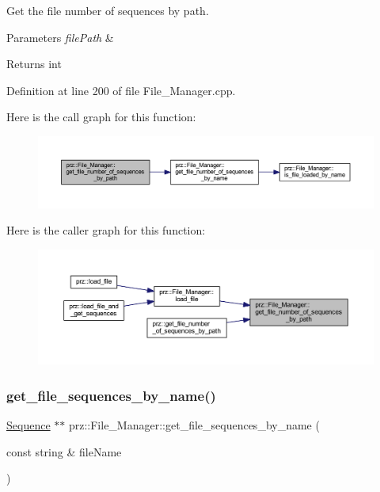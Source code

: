 Get the file number of sequences by path. 


\begin{DoxyParams}{Parameters}
{\em file\+Path} & \\
\hline
\end{DoxyParams}
\begin{DoxyReturn}{Returns}
int 
\end{DoxyReturn}


Definition at line 200 of file File\+\_\+\+Manager.\+cpp.

Here is the call graph for this function\+:
\nopagebreak
\begin{figure}[H]
\begin{center}
\leavevmode
\includegraphics[width=350pt]{classprz_1_1_file___manager_a14c8b3151837fbb69614eb30499c534a_cgraph}
\end{center}
\end{figure}
Here is the caller graph for this function\+:
\nopagebreak
\begin{figure}[H]
\begin{center}
\leavevmode
\includegraphics[width=350pt]{classprz_1_1_file___manager_a14c8b3151837fbb69614eb30499c534a_icgraph}
\end{center}
\end{figure}
\mbox{\label{classprz_1_1_file___manager_a9e617521f5fa135f8ecb4b967eed4b7c}} 
\subsubsection{\texorpdfstring{get\_file\_sequences\_by\_name()}{get\_file\_sequences\_by\_name()}}
{\footnotesize\ttfamily \mbox{\hyperlink{classprz_1_1_sequence}{Sequence}} $\ast$$\ast$ prz\+::\+File\+\_\+\+Manager\+::get\+\_\+file\+\_\+sequences\+\_\+by\+\_\+name (\begin{DoxyParamCaption}\item[{const string \&}]{file\+Name }\end{DoxyParamCaption})}




